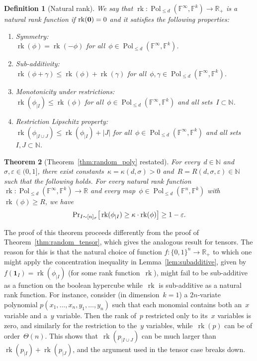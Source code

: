\documentclass[10pt]{article}
\newtheorem{theorem}{Theorem}[section]
\newtheorem{definition}[theorem]{Definition}
\renewcommand{\Pr}{\mbox{\rm Pr}}
\newcommand{\R}{\mathbb{R}}
\newcommand{\N}{\mathbb{N}}
\newcommand{\F}{\mathbb{F}}
\newcommand{\bset}[1]{\{0,1\}^{#1}}
\newcommand{\1}{\mathbf{1}}
\newcommand{\one}{\mathbf{1}}
\newcommand{\eps}{\varepsilon}
\DeclareMathOperator{\rank}{rk}
\DeclareMathOperator{\Pol}{Pol}
\newcommand{\beqn}{\begin{equation*}}
\newcommand{\eeqn}{\end{equation*}}
\begin{document}
\begin{definition}[Natural rank]
We say that $\rank: \Pol_{\leq d}(\F^{\infty}, \F^k) \to \R_+$ is a natural rank function if $\rank({\bf 0}) = 0$ and it satisfies the following properties:
\begin{enumerate}
    \item Symmetry: \\
    $\rank(\phi) = \rank(-\phi)$ for all~$\phi\in \Pol_{\leq d}(\F^{\infty}, \F^k)$.
    \item Sub-additivity: \\
    $\rank(\phi + \gamma) \leq \rank(\phi) + \rank(\gamma)$ for all~$\phi, \gamma\in \Pol_{\leq d}(\F^{\infty}, \F^k)$.
    \item Monotonicity under restrictions: \\
    $\rank(\phi_{|I}) \leq \rank(\phi)$ for all~$\phi\in \Pol_{\leq d}(\F^{\infty}, \F^k)$ and all sets~$I \subset \N$.
    \item Restriction Lipschitz property: \\
    $\rank(\phi_{|I \cup J}) \leq \rank(\phi_{|I}) + |J|$ for all~$\phi\in \Pol_{\leq d}(\F^{\infty}, \F^k)$ and all sets~$I, J \subset \N$.
\end{enumerate}
\end{definition}
\setcounter{equation}{3}
\begin{theorem}[Theorem~\ref{thm:random_poly} restated]
For every~$d\in \N$ and~$\sigma,\eps\in (0,1]$, there exist constants~$\kappa = \kappa(d, \sigma)>0$ and~$R = R(d,\sigma,\eps)\in\N$ such that the following holds.
For every natural rank function~$\rank: \Pol_{\leq d}(\F^{\infty}, \F^k) \to \R$ and every map~$\phi \in \Pol_{\leq d}(\F^n, \F^k)$ with~$\rank(\phi) \geq R$, we have
\beqn
\Pr_{I\sim [n]_{\sigma}}\big[ \rank(\phi_{|I}) \geq \kappa\cdot \rank(\phi)\big] \geq 1 - \eps.
\eeqn
\end{theorem}

The proof of this theorem proceeds differently from the proof of Theorem~\ref{thm:random_tensor}, which gives the analogous result for tensors.
The reason for this is that the natural choice of function $f:\bset{n}\to \R_+$ to which one might apply the concentration inequality in Lemma~\ref{lem:subadditive}, given by $f(\one_I) = \rank(\phi_{|I})$ (for some rank function~$\rank$), might fail to be sub-additive as a function on the boolean hypercube while~$\rank$ is sub-additive as a natural rank function.
For instance, consider (in dimension~$k=1$) a $2n$-variate polynomial $p(x_1,\dots,x_n,y_1,\dots,y_n)$ such that each monomial contains both an~$x$ variable and a~$y$ variable.
Then the rank of~$p$ restricted only to its~$x$ variables is zero, and similarly for the restriction to the~$y$ variables, while~$\rank(p)$ can be of order~$\Theta(n)$.
This shows that~$\rank(p_{|I \cup J})$ can be much larger than $\rank(p_{|I}) + \rank(p_{|J})$, and the argument used in the tensor case breaks down.
\end{document}
